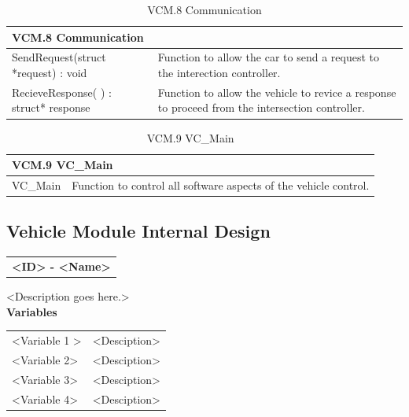 \documentclass [10pt]{article}
\begin{document}
\begin{longtable}{| p{ } | p{ } | }\caption{VCM.8 Communication} \\\hline  
 \multicolumn{2}{|l|}{\textbf {VCM.8 Communication}}\\ \hline
\cellcolor{tableCell}SendRequest(struct *request) : void & \cellcolor{tableCell}Function to allow the car to send a request to the interection controller. \\ \hline 

RecieveResponse( ) : struct* response  &Function to allow the vehicle to revice a response to proceed from the intersection controller. \\ \hline 

\end{longtable}


\begin{longtable}{| p{ } | p{ } | }\caption{VCM.9 VC\_Main} \\\hline  
 \multicolumn{2}{|l|}{\textbf {VCM.9 VC\_Main}}\\ \hline
\cellcolor{tableCell}VC\_Main& \cellcolor{tableCell}Function to control all software aspects of the vehicle control.  \\ \hline 

\end{longtable}






\subsection{Vehicle Module Internal Design}



\begin{longtable}{p{}}
\rowcolor{subsectionC}\textbf{<ID> - <Name>} \\
\end{longtable}

<Description goes here.>  \\

\textbf{Variables} 

\begin{longtable}{ p{ }  p{ }} \\ 

 
\rowcolor{tableCell} <Variable 1 >& <Desciption> \\ 
<Variable 2>& <Desciption> \\

\rowcolor{tableCell}<Variable 3> & <Desciption> \\ 
<Variable 4>& <Desciption> \\

\end{longtable}
\end{document}
